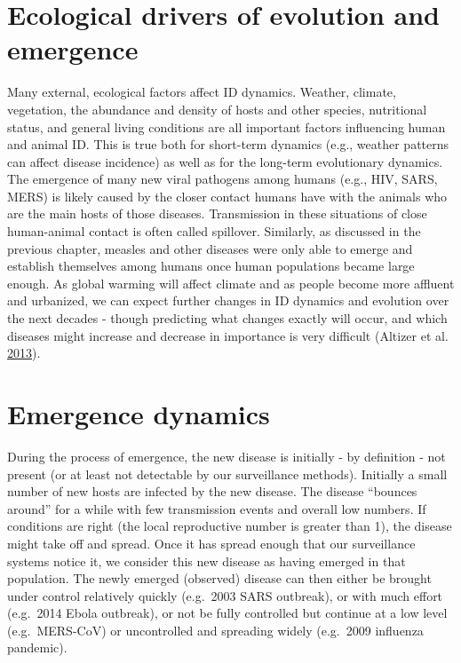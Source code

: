 \documentclass[]{book}
\theoremstyle{definition}
\theoremstyle{definition}
\theoremstyle{definition}
\theoremstyle{remark}
\begin{document}
\section{Ecological drivers of evolution and
emergence}\label{ecological-drivers-of-evolution-and-emergence}

Many external, ecological factors affect ID dynamics. Weather, climate,
vegetation, the abundance and density of hosts and other species,
nutritional status, and general living conditions are all important
factors influencing human and animal ID. This is true both for
short-term dynamics (e.g., weather patterns can affect disease
incidence) as well as for the long-term evolutionary dynamics. The
emergence of many new viral pathogens among humans (e.g., HIV, SARS,
MERS) is likely caused by the closer contact humans have with the
animals who are the main hosts of those diseases. Transmission in these
situations of close human-animal contact is often called spillover.
Similarly, as discussed in the previous chapter, measles and other
diseases were only able to emerge and establish themselves among humans
once human populations became large enough. As global warming will
affect climate and as people become more affluent and urbanized, we can
expect further changes in ID dynamics and evolution over the next
decades - though predicting what changes exactly will occur, and which
diseases might increase and decrease in importance is very difficult
(Altizer et al. \protect\hyperlink{ref-altizer13}{2013}).

\section{Emergence dynamics}\label{emergence-dynamics}

During the process of emergence, the new disease is initially - by
definition - not present (or at least not detectable by our surveillance
methods). Initially a small number of new hosts are infected by the new
disease. The disease ``bounces around'' for a while with few
transmission events and overall low numbers. If conditions are right
(the local reproductive number is greater than 1), the disease might
take off and spread. Once it has spread enough that our surveillance
systems notice it, we consider this new disease as having emerged in
that population. The newly emerged (observed) disease can then either be
brought under control relatively quickly (e.g.~2003 SARS outbreak), or
with much effort (e.g.~2014 Ebola outbreak), or not be fully controlled
but continue at a low level (e.g.~MERS-CoV) or uncontrolled and
spreading widely (e.g.~2009 influenza pandemic).
\end{document}
